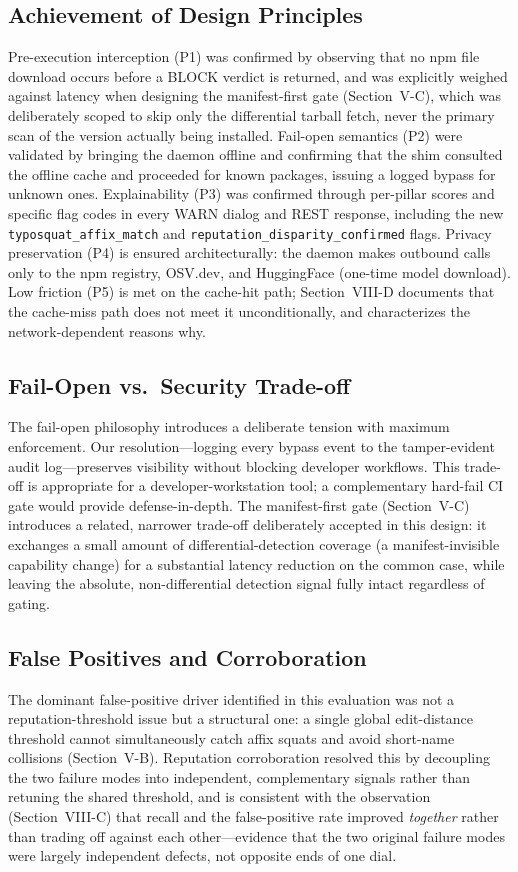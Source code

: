 \documentclass[journal]{IEEEtran}
\begin{document}
\subsection{Achievement of Design Principles}
Pre-execution interception (P1) was confirmed by observing that no npm file download occurs before a BLOCK
verdict is returned, and was explicitly weighed against latency when designing the manifest-first gate
(Section~V-C), which was deliberately scoped to skip only the differential tarball fetch, never the primary
scan of the version actually being installed. Fail-open semantics (P2) were validated by bringing the daemon
offline and confirming that the shim consulted the offline cache and proceeded for known packages, issuing a
logged bypass for unknown ones. Explainability (P3) was confirmed through per-pillar scores and specific flag
codes in every WARN dialog and REST response, including the new \texttt{typosquat\_affix\_match} and
\texttt{reputation\_disparity\_confirmed} flags. Privacy preservation (P4) is ensured architecturally: the
daemon makes outbound calls only to the npm registry, OSV.dev, and HuggingFace (one-time model download).
Low friction (P5) is met on the cache-hit path; Section~VIII-D documents that the cache-miss path does not
meet it unconditionally, and characterizes the network-dependent reasons why.

\subsection{Fail-Open vs.\ Security Trade-off}
The fail-open philosophy introduces a deliberate tension with maximum enforcement. Our resolution---logging
every bypass event to the tamper-evident audit log---preserves visibility without blocking developer
workflows. This trade-off is appropriate for a developer-workstation tool; a complementary hard-fail CI gate
would provide defense-in-depth. The manifest-first gate (Section~V-C) introduces a related, narrower
trade-off deliberately accepted in this design: it exchanges a small amount of differential-detection
coverage (a manifest-invisible capability change) for a substantial latency reduction on the common case,
while leaving the absolute, non-differential detection signal fully intact regardless of gating.

\subsection{False Positives and Corroboration}
The dominant false-positive driver identified in this evaluation was not a reputation-threshold issue but a
structural one: a single global edit-distance threshold cannot simultaneously catch affix squats and avoid
short-name collisions (Section~V-B). Reputation corroboration resolved this by decoupling the two failure
modes into independent, complementary signals rather than retuning the shared threshold, and is consistent
with the observation (Section~VIII-C) that recall and the false-positive rate improved \emph{together}
rather than trading off against each other---evidence that the two original failure modes were largely
independent defects, not opposite ends of one dial.
\end{document}
